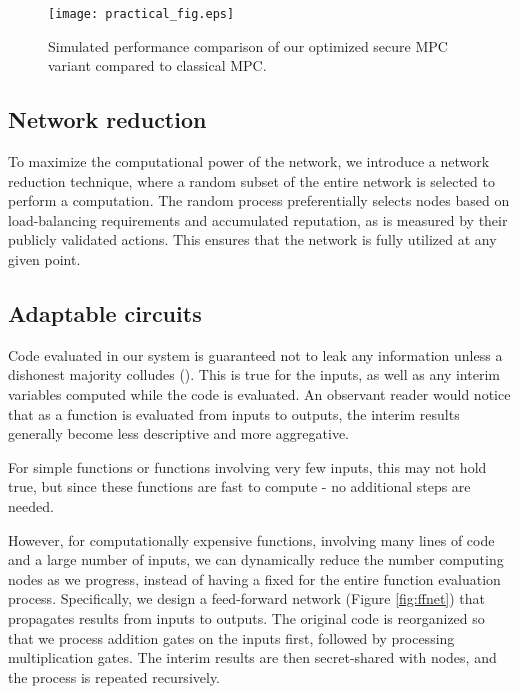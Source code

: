 \documentclass{article} \usepackage{nips13submit_e,times}
\begin{document}
\begin{figure}[htbp]
\texttt{[image: practical\_fig.eps]}
\caption{Simulated performance comparison of our optimized secure MPC variant compared to classical MPC.}
\label{fig:mpc_sim2}
\end{figure}

\subsection{Network reduction}

To maximize the computational power of the network, we introduce a network reduction technique, where a random subset of the entire network is selected to perform a computation. The random process preferentially selects nodes based on load-balancing requirements and accumulated reputation, as is measured by their publicly validated actions. This ensures that the network is fully utilized at any given point.



\subsection{Adaptable circuits}

Code evaluated in our system is guaranteed not to leak any information unless a dishonest majority colludes (). This is true for the inputs, as well as any interim variables computed while the code is evaluated. An observant reader would notice that as a function is evaluated from inputs to outputs, the interim results generally become less descriptive and more aggregative.

For simple functions or functions involving very few inputs, this may not hold true, but since these functions are fast to compute - no additional steps are needed.

However, for computationally expensive functions, involving many lines of code and a large number of inputs, we can dynamically reduce the number computing nodes as we progress, instead of having a fixed  for the entire function evaluation process. Specifically, we design a feed-forward network (Figure \ref{fig:ffnet}) that propagates results from inputs to outputs. The original code is reorganized so that we process addition gates on the inputs first, followed by processing multiplication gates. The interim results are then secret-shared with  nodes, and the process is repeated recursively.
\end{document}
